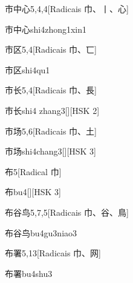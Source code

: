 \begin{entry}{市中心}{5,4,4}[Radicais ⼱、⼁、⼼]
  \begin{phonetics}{市中心}{shi4zhong1xin1}
  \end{phonetics}
\end{entry}

\begin{entry}{市区}{5,4}[Radicais ⼱、⼖]
  \begin{phonetics}{市区}{shi4qu1}
  \end{phonetics}
\end{entry}

\begin{entry}{市长}{5,4}[Radicais ⼱、⾧]
  \begin{phonetics}{市长}{shi4 zhang3}[][HSK 2]
  \end{phonetics}
\end{entry}

\begin{entry}{市场}{5,6}[Radicais ⼱、⼟]
  \begin{phonetics}{市场}{shi4chang3}[][HSK 3]
  \end{phonetics}
\end{entry}

\begin{entry}{布}{5}[Radical ⼱]
  \begin{phonetics}{布}{bu4}[][HSK 3]
  \end{phonetics}
\end{entry}

\begin{entry}{布谷鸟}{5,7,5}[Radicais ⼱、⾕、⿃]
  \begin{phonetics}{布谷鸟}{bu4gu3niao3}
  \end{phonetics}
\end{entry}

\begin{entry}{布署}{5,13}[Radicais ⼱、⽹]
  \begin{phonetics}{布署}{bu4shu3}
  \end{phonetics}
\end{entry}

